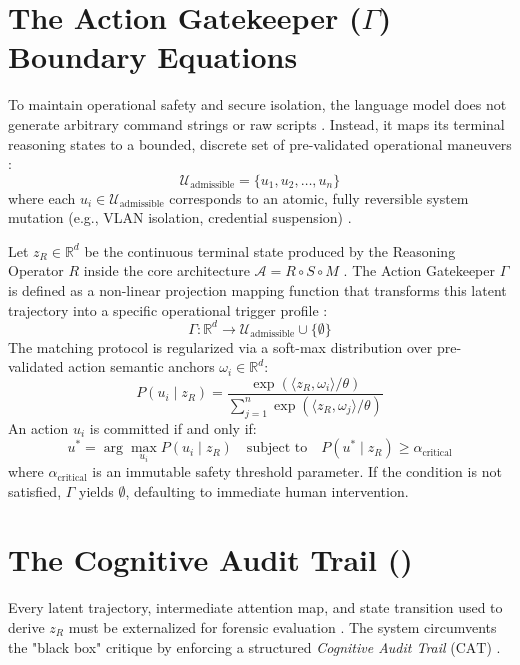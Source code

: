 \section{\texorpdfstring{The Action Gatekeeper ($\Gamma$) Boundary Equations}{The Action Gatekeeper Boundary Equations}}
To maintain operational safety and secure isolation, the language model does not generate arbitrary command strings or raw scripts \cite{Manifesto:IncidentResponse}. Instead, it maps its terminal reasoning states to a bounded, discrete set of pre-validated operational maneuvers \cite{Manifesto:IncidentResponse}:
\begin{equation}
    \mathcal{U}_{\text{admissible}} = \{u_1, u_2, \dots, u_n\}
\end{equation}
where each $u_i \in \mathcal{U}_{\text{admissible}}$ corresponds to an atomic, fully reversible system mutation (e.g., VLAN isolation, credential suspension) \cite{Manifesto:IncidentResponse}.

Let $z_R \in \mathbb{R}^d$ be the continuous terminal state produced by the Reasoning Operator $R$ inside the core architecture $\mathcal{A} = R \circ S \circ M$ \cite{Realignment:TripleOperators}. The Action Gatekeeper $\Gamma$ is defined as a non-linear projection mapping function that transforms this latent trajectory into a specific operational trigger profile \cite{Realignment:TripleOperators}:
\begin{equation}
    \Gamma: \mathbb{R}^d \longrightarrow \mathcal{U}_{\text{admissible}} \cup \{\emptyset\}
\end{equation}
The matching protocol is regularized via a soft-max distribution over pre-validated action semantic anchors $\omega_i \in \mathbb{R}^d$:
\begin{equation}
    P(u_i \mid z_R) = \frac{\exp(\langle z_R, \omega_i \rangle / \theta)}{\sum_{j=1}^{n} \exp(\langle z_R, \omega_j \rangle / \theta)}
\end{equation}
An action $u_i$ is committed if and only if:
\begin{equation}
    u^* = \arg\max_{u_i} P(u_i \mid z_R) \quad \text{subject to} \quad P(u^* \mid z_R) \ge \alpha_{\text{critical}}
\end{equation}
where $\alpha_{\text{critical}}$ is an immutable safety threshold parameter. If the condition is not satisfied, $\Gamma$ yields $\emptyset$, defaulting to immediate human intervention.

\section{\texorpdfstring{The Cognitive Audit Trail ()}{The Cognitive Audit Trail (CAT)}}
Every latent trajectory, intermediate attention map, and state transition used to derive $z_R$ must be externalized for forensic evaluation \cite{Manifesto:IncidentResponse}. The system circumvents the "black box" critique by enforcing a structured \textit{Cognitive Audit Trail} ($\text{CAT}$) \cite{Manifesto:IncidentResponse}.

